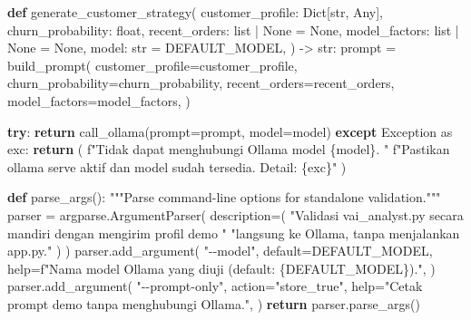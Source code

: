 \documentclass[
  indonesian,
  letterpaper,
  DIV=11,
  numbers=noendperiod]{scrreprt}
\newenvironment{Shaded}{\begin{snugshade}}{\end{snugshade}}
\newcommand{\BuiltInTok}[1]{\textcolor[rgb]{0.00,0.23,0.31}{#1}}
\newcommand{\CommentTok}[1]{\textcolor[rgb]{0.37,0.37,0.37}{#1}}
\newcommand{\ControlFlowTok}[1]{\textcolor[rgb]{0.00,0.23,0.31}{\textbf{#1}}}
\newcommand{\ImportTok}[1]{\textcolor[rgb]{0.00,0.46,0.62}{#1}}
\newcommand{\KeywordTok}[1]{\textcolor[rgb]{0.00,0.23,0.31}{\textbf{#1}}}
\newcommand{\NormalTok}[1]{\textcolor[rgb]{0.00,0.23,0.31}{#1}}
\newcommand{\OperatorTok}[1]{\textcolor[rgb]{0.37,0.37,0.37}{#1}}
\newcommand{\PreprocessorTok}[1]{\textcolor[rgb]{0.68,0.00,0.00}{#1}}
\newcommand{\SpecialCharTok}[1]{\textcolor[rgb]{0.37,0.37,0.37}{#1}}
\newcommand{\SpecialStringTok}[1]{\textcolor[rgb]{0.13,0.47,0.30}{#1}}
\newcommand{\StringTok}[1]{\textcolor[rgb]{0.13,0.47,0.30}{#1}}
\newcommand{\VariableTok}[1]{\textcolor[rgb]{0.07,0.07,0.07}{#1}}
\begin{document}
\begin{Shaded}
\begin{Highlighting}[]
\KeywordTok{def}\NormalTok{ generate\_customer\_strategy(}
\NormalTok{    customer\_profile: Dict[}\BuiltInTok{str}\NormalTok{, Any],}
\NormalTok{    churn\_probability: }\BuiltInTok{float}\NormalTok{,}
\NormalTok{    recent\_orders: }\BuiltInTok{list} \OperatorTok{|} \VariableTok{None} \OperatorTok{=} \VariableTok{None}\NormalTok{,}
\NormalTok{    model\_factors: }\BuiltInTok{list} \OperatorTok{|} \VariableTok{None} \OperatorTok{=} \VariableTok{None}\NormalTok{,}
\NormalTok{    model: }\BuiltInTok{str} \OperatorTok{=}\NormalTok{ DEFAULT\_MODEL,}
\NormalTok{) }\OperatorTok{{-}\textgreater{}} \BuiltInTok{str}\NormalTok{:}
\NormalTok{    prompt }\OperatorTok{=}\NormalTok{ build\_prompt(}
\NormalTok{        customer\_profile}\OperatorTok{=}\NormalTok{customer\_profile,}
\NormalTok{        churn\_probability}\OperatorTok{=}\NormalTok{churn\_probability,}
\NormalTok{        recent\_orders}\OperatorTok{=}\NormalTok{recent\_orders,}
\NormalTok{        model\_factors}\OperatorTok{=}\NormalTok{model\_factors,}
\NormalTok{    )}

    \ControlFlowTok{try}\NormalTok{:}
        \ControlFlowTok{return}\NormalTok{ call\_ollama(prompt}\OperatorTok{=}\NormalTok{prompt, model}\OperatorTok{=}\NormalTok{model)}
    \ControlFlowTok{except} \PreprocessorTok{Exception} \ImportTok{as}\NormalTok{ exc:}
        \ControlFlowTok{return}\NormalTok{ (}
            \SpecialStringTok{f"Tidak dapat menghubungi Ollama model \textquotesingle{}}\SpecialCharTok{\{}\NormalTok{model}\SpecialCharTok{\}}\SpecialStringTok{\textquotesingle{}. "}
            \SpecialStringTok{f"Pastikan \textasciigrave{}ollama serve\textasciigrave{} aktif dan model sudah tersedia. Detail: }\SpecialCharTok{\{}\NormalTok{exc}\SpecialCharTok{\}}\SpecialStringTok{"}
\NormalTok{        )}


\KeywordTok{def}\NormalTok{ parse\_args():}
    \CommentTok{"""Parse command{-}line options for standalone validation."""}
\NormalTok{    parser }\OperatorTok{=}\NormalTok{ argparse.ArgumentParser(}
\NormalTok{        description}\OperatorTok{=}\NormalTok{(}
            \StringTok{"Validasi vai\_analyst.py secara mandiri dengan mengirim profil demo "}
            \StringTok{"langsung ke Ollama, tanpa menjalankan app.py."}
\NormalTok{        )}
\NormalTok{    )}
\NormalTok{    parser.add\_argument(}
        \StringTok{"{-}{-}model"}\NormalTok{,}
\NormalTok{        default}\OperatorTok{=}\NormalTok{DEFAULT\_MODEL,}
        \BuiltInTok{help}\OperatorTok{=}\SpecialStringTok{f"Nama model Ollama yang diuji (default: }\SpecialCharTok{\{}\NormalTok{DEFAULT\_MODEL}\SpecialCharTok{\}}\SpecialStringTok{)."}\NormalTok{,}
\NormalTok{    )}
\NormalTok{    parser.add\_argument(}
        \StringTok{"{-}{-}prompt{-}only"}\NormalTok{,}
\NormalTok{        action}\OperatorTok{=}\StringTok{"store\_true"}\NormalTok{,}
        \BuiltInTok{help}\OperatorTok{=}\StringTok{"Cetak prompt demo tanpa menghubungi Ollama."}\NormalTok{,}
\NormalTok{    )}
    \ControlFlowTok{return}\NormalTok{ parser.parse\_args()}



\end{Highlighting}
\end{Shaded}
\end{document}
